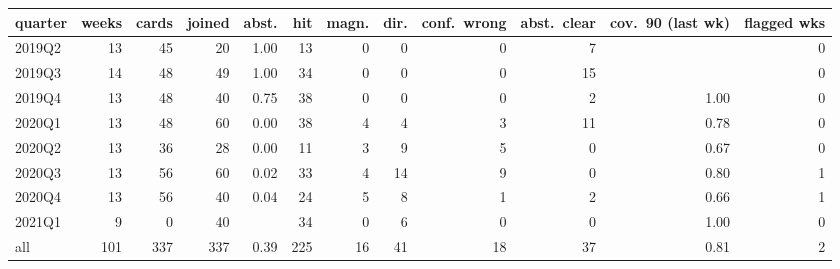 \begin{tabular}{lrrrrrrrrrrr}
\toprule
quarter & weeks & cards & joined & abst. & hit & magn. & dir. & conf.\ wrong & abst.\ clear & cov.\ 90 (last wk) & flagged wks \\
\midrule
2019Q2 & 13 & 45 & 20 & 1.00 & 13 & 0 & 0 & 0 & 7 &  & 0 \\
2019Q3 & 14 & 48 & 49 & 1.00 & 34 & 0 & 0 & 0 & 15 &  & 0 \\
2019Q4 & 13 & 48 & 40 & 0.75 & 38 & 0 & 0 & 0 & 2 & 1.00 & 0 \\
2020Q1 & 13 & 48 & 60 & 0.00 & 38 & 4 & 4 & 3 & 11 & 0.78 & 0 \\
2020Q2 & 13 & 36 & 28 & 0.00 & 11 & 3 & 9 & 5 & 0 & 0.67 & 0 \\
2020Q3 & 13 & 56 & 60 & 0.02 & 33 & 4 & 14 & 9 & 0 & 0.80 & 1 \\
2020Q4 & 13 & 56 & 40 & 0.04 & 24 & 5 & 8 & 1 & 2 & 0.66 & 1 \\
2021Q1 & 9 & 0 & 40 &  & 34 & 0 & 6 & 0 & 0 & 1.00 & 0 \\
\midrule
all & 101 & 337 & 337 & 0.39 & 225 & 16 & 41 & 18 & 37 & 0.81 & 2 \\
\bottomrule
\end{tabular}
